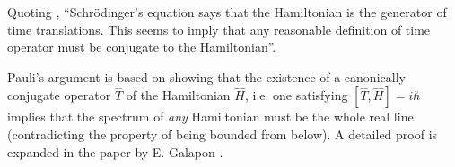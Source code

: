 \documentclass[a0,portrait]{a0poster}
\begin{document}
\begin{multicols}{2}
Quoting \cite{Maccone:Pauli},
``Schr\"odinger's equation says that the Hamiltonian is the generator of time translations. This seems
to imply that any reasonable definition of time operator must be conjugate to the Hamiltonian''.

Pauli's argument
is based on showing that
the existence of
a canonically conjugate operator $\hat{T}$ of the Hamiltonian $\hat{H}$,
i.e. one satisfying
$
  \label{THcommutator}
  [\hat{T}, \hat{H}] = i\hbar
$
implies that the spectrum of \emph{any} Hamiltonian must be the whole real line
(contradicting the property of being bounded from below).
A detailed proof is expanded in the paper by E. Galapon \cite{Galapon2002}.







\end{multicols}
\end{document}
